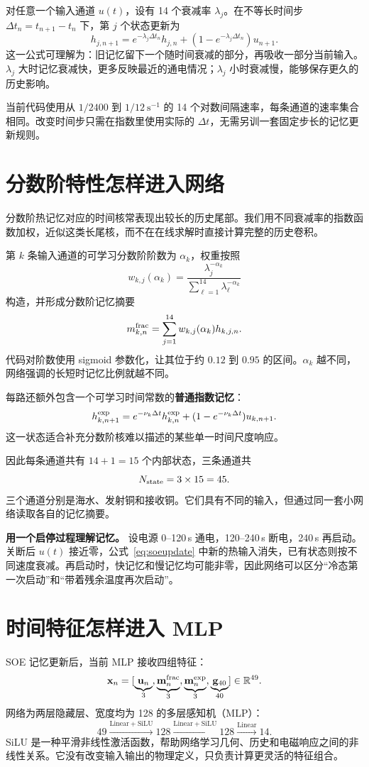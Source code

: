 对任意一个输入通道 $u(t)$，设有 14 个衰减率 $\lambda_j$。在不等长时间步 $\Delta t_n=t_{n+1}-t_n$ 下，第 $j$ 个状态更新为
\begin{equation}
\label{eq:soeupdate}
h_{j,n+1}=
e^{-\lambda_j\Delta t_n}h_{j,n}
+(1-e^{-\lambda_j\Delta t_n})u_{n+1}.
\end{equation}
这一公式可理解为：旧记忆留下一个随时间衰减的部分，再吸收一部分当前输入。$\lambda_j$ 大时记忆衰减快，更多反映最近的通电情况；$\lambda_j$ 小时衰减慢，能够保存更久的历史影响。

当前代码使用从 $1/2400$ 到 $1/12\ \mathrm{s}^{-1}$ 的 14 个对数间隔速率，每条通道的速率集合相同。改变时间步只需在指数里使用实际的 $\Delta t$，无需另训一套固定步长的记忆更新规则。

\section{分数阶特性怎样进入网络}
分数阶热记忆对应的时间核常表现出较长的历史尾部。我们用不同衰减率的指数函数加权，近似这类长尾核，而不在在线求解时直接计算完整的历史卷积。

第 $k$ 条输入通道的可学习分数阶阶数为 $\alpha_k$，权重按照
\begin{equation}
w_{k,j}(\alpha_k)=
\frac{\lambda_j^{-\alpha_k}}
{\sum_{\ell=1}^{14}\lambda_\ell^{-\alpha_k}}
\end{equation}
构造，并形成分数阶记忆摘要
\[
m_{k,n}^{\rm frac}=
\sum_{j=1}^{14}w_{k,j}(\alpha_k)h_{k,j,n}.
\]
代码对阶数使用 sigmoid 参数化，让其位于约 $0.12$ 到 $0.95$ 的区间。$\alpha_k$ 越不同，网络强调的长短时记忆比例就越不同。

每路还额外包含一个可学习时间常数的\textbf{普通指数记忆}：
\[
h^{\rm exp}_{k,n+1}
=e^{-\nu_k\Delta t}h^{\rm exp}_{k,n}
+(1-e^{-\nu_k\Delta t})u_{k,n+1}.
\]
这一状态适合补充分数阶核难以描述的某些单一时间尺度响应。

因此每条通道共有 $14+1=15$ 个内部状态，三条通道共
\[
N_{\rm state}=3\times15=45.
\]
三个通道分别是海水、发射铜和接收铜。它们具有不同的输入，但通过同一套小网络读取各自的记忆摘要。

\begin{examplebox}
\textbf{用一个启停过程理解记忆。} 设电源 0--120\,s 通电，120--240\,s 断电，240\,s 再启动。关断后 $u(t)$ 接近零，公式~\eqref{eq:soeupdate} 中新的热输入消失，已有状态则按不同速度衰减。再启动时，快记忆和慢记忆均可能非零，因此网络可以区分“冷态第一次启动”和“带着残余温度再次启动”。
\end{examplebox}

\section{时间特征怎样进入 MLP}
SOE 记忆更新后，当前 MLP 接收四组特征：
\[
\mathbf x_n=
[\underbrace{\mathbf u_n}_{3},
 \underbrace{\mathbf m_n^{\rm frac}}_{3},
 \underbrace{\mathbf m_n^{\rm exp}}_{3},
 \underbrace{\mathbf g_{40}}_{40}]
\in\mathbb R^{49}.
\]
网络为两层隐藏层、宽度均为 128 的多层感知机（MLP）：
\[
49\xrightarrow{\mathrm{Linear+SiLU}}128
\xrightarrow{\mathrm{Linear+SiLU}}128
\xrightarrow{\mathrm{Linear}}14.
\]
SiLU 是一种平滑非线性激活函数，帮助网络学习几何、历史和电磁响应之间的非线性关系。它没有改变输入输出的物理定义，只负责计算更灵活的特征组合。

